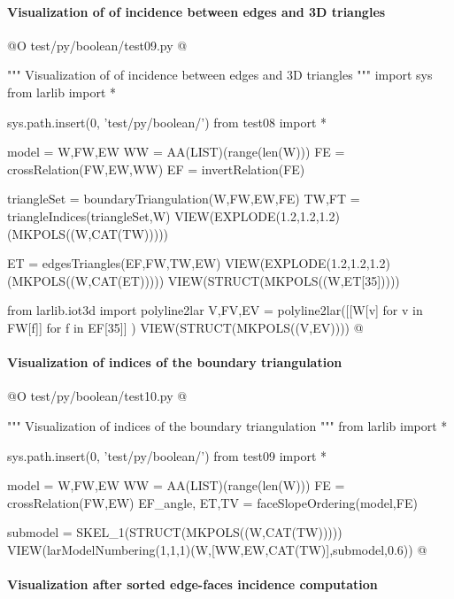 \documentclass[11pt,oneside]{article}    %
\begin{document}
\paragraph{Visualization of of incidence between edges and 3D triangles}

@O test/py/boolean/test09.py @{
""" Visualization of of incidence between edges and 3D triangles """
import sys
from larlib import *

sys.path.insert(0, 'test/py/boolean/')
from test08 import *

model = W,FW,EW
WW = AA(LIST)(range(len(W)))
FE = crossRelation(FW,EW,WW)
EF = invertRelation(FE)

triangleSet = boundaryTriangulation(W,FW,EW,FE)
TW,FT = triangleIndices(triangleSet,W)
VIEW(EXPLODE(1.2,1.2,1.2)(MKPOLS((W,CAT(TW)))))

ET = edgesTriangles(EF,FW,TW,EW)
VIEW(EXPLODE(1.2,1.2,1.2)(MKPOLS((W,CAT(ET)))))
VIEW(STRUCT(MKPOLS((W,ET[35]))))

from larlib.iot3d import polyline2lar
V,FV,EV = polyline2lar([[W[v] for v in FW[f]] for f in EF[35]] )
VIEW(STRUCT(MKPOLS((V,EV))))
@}



\paragraph{Visualization of indices of the boundary triangulation}

@O test/py/boolean/test10.py @{
""" Visualization of indices of the boundary triangulation """
from larlib import *

sys.path.insert(0, 'test/py/boolean/')
from test09 import *

model = W,FW,EW
WW = AA(LIST)(range(len(W)))
FE = crossRelation(FW,EW)
EF_angle, ET,TV = faceSlopeOrdering(model,FE)

submodel = SKEL_1(STRUCT(MKPOLS((W,CAT(TW)))))
VIEW(larModelNumbering(1,1,1)(W,[WW,EW,CAT(TW)],submodel,0.6))
@}


\paragraph{Visualization after sorted edge-faces incidence computation}
\end{document}
